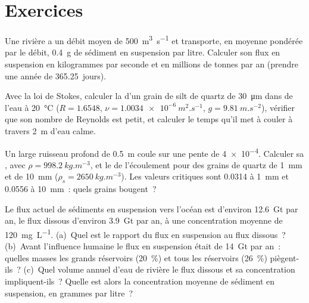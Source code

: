 \section{Exercices}

\begin{exercise}[$\star$]\label{exo:b1:erosion-transport:1}
Une rivière a un débit moyen de \qty{500}{m^3.s^{-1}} et transporte, en moyenne
pondérée par le débit, \qty{0.4}{g} de sédiment en suspension par litre. Calculer son
flux en suspension en kilogrammes par seconde et en millions de tonnes par an (prendre une
année de \num{365.25}~jours).
\end{exercise}

\begin{exercise}[$\star$]\label{exo:b1:erosion-transport:2}
Avec la loi de Stokes, calculer la  d'un grain de silt de quartz
de \qty{30}{\micro m} dans de l'eau à \qty{20}{\celsius} ($R = 1.6548$, $\nu =
\qty{1.0034e-6}{m^2.s^{-1}}$, $g = \qty{9.81}{m.s^{-2}}$), vérifier que son
nombre de Reynolds est petit, et calculer le temps qu'il met à couler à travers
\qty{2}{m} d'eau calme.
\end{exercise}

\begin{exercise}[$\star$]\label{exo:b1:erosion-transport:3}
Un large ruisseau profond de \qty{0.5}{m} coule sur une pente de \num{4e-4}. Calculer sa
, avec $\rho = \qty{998.2}{kg.m^{-3}}$, et le  de l'écoulement pour des grains de quartz de \qty{1}{mm} et de \qty{10}{mm}
($\rho_s = \qty{2650}{kg.m^{-3}}$). Les valeurs critiques sont \num{0.0314} à
\qty{1}{mm} et \num{0.0556} à \qty{10}{mm}~: quels grains bougent~?
\end{exercise}

\begin{exercise}[$\star$]\label{exo:b1:erosion-transport:4}
Le flux actuel de sédiments en suspension vers l'océan est d'environ \qty{12.6}{Gt} par
an, le flux dissous d'environ \qty{3.9}{Gt} par an, à une concentration moyenne de
\qty{120}{mg.L^{-1}}. (a)~Quel est le rapport du flux en suspension au flux
dissous~? (b)~Avant l'influence humaine le flux en suspension était de \qty{14}{Gt} par an~:
quelles masses les grands réservoirs (\qty{20}{\percent}) et tous les réservoirs
(\qty{26}{\percent}) piègent-ils~? (c)~Quel volume annuel d'eau de rivière le
flux dissous et sa concentration impliquent-ils~? Quelle est alors la concentration moyenne
de sédiment en suspension, en grammes par litre~?
\end{exercise}

